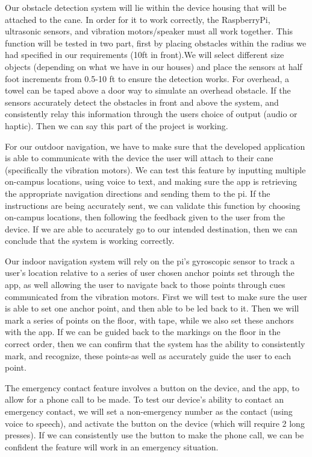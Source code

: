 \documentclass[letterpaper,12pt]{article}
\begin{document}
Our obstacle detection system will lie within the device housing that will be attached to the cane. In order for it to work correctly, the RaspberryPi, ultrasonic sensors, and vibration motors/speaker must all work together. This function will be tested in two part, first by placing obstacles within the radius we had specified in our requirements (10ft in front).We will select different size objects (depending on what we have in our houses) and place the sensors at half foot increments from 0.5-10 ft to ensure the detection works. For overhead, a towel can be taped above a door way to simulate an overhead obstacle. If the sensors accurately detect the obstacles in  front and above the system, and consistently relay this information through the users choice of output (audio or haptic). Then we can say this part of the project is working.\par

For our outdoor navigation, we have to make sure that the developed application is able to communicate with the device the user will attach to their cane (specifically the vibration motors). We can test this feature by inputting multiple on-campus locations, using voice to text, and making sure the app is retrieving the appropriate navigation directions and sending them to the pi. If the instructions are being accurately sent, we can validate this function by
choosing on-campus locations, then following the feedback given to the user from the device. If we are able to accurately go to our intended destination, then we can conclude that the system is working correctly.\par

Our indoor navigation system will rely on the pi's gyroscopic sensor to track a user's location relative to a series of user chosen anchor points set through the app, as well allowing the user to navigate back to those points through cues communicated from the vibration motors. First we will test to make sure the user is able to set one anchor point, and then able to be led back to it. Then we will mark a series of points on the floor, with tape, while we also set these anchors with the app. If we can be guided back to the markings on the floor in the correct order, then we can confirm that the system has the ability to consistently mark, and recognize, these points-as well as accurately guide the user to each point. \par

The emergency contact feature involves a button on the device, and the app, to allow for a phone call to be made. To test our device's ability to contact an emergency contact, we will set a non-emergency number as the contact (using voice to speech), and activate the button on the device (which will require 2 long presses). If we can consistently use the button to make the phone call, we can be confident the feature will work in an emergency situation.\par
\end{document}
